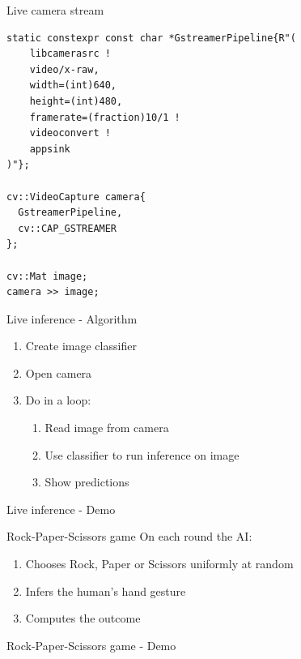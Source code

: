 \begin{frame}[fragile]{Live camera stream}
  \lstset{basicstyle=\ttfamily\small, showstringspaces=false, numbers=left,
  columns=fullflexible}
  \begin{lstlisting}
static constexpr const char *GstreamerPipeline{R"(
    libcamerasrc !
    video/x-raw,
    width=(int)640,
    height=(int)480,
    framerate=(fraction)10/1 !
    videoconvert !
    appsink
)"};

cv::VideoCapture camera{
  GstreamerPipeline,
  cv::CAP_GSTREAMER
};

cv::Mat image;
camera >> image;
  \end{lstlisting}
\end{frame}

\begin{frame}{Live inference - Algorithm}
  \begin{enumerate}
	\item Create image classifier
	\item Open camera
	\item Do in a loop:
	\begin{enumerate}
	  \item Read image from camera
	  \item Use classifier to run inference on image
	  \item Show predictions
	\end{enumerate}
  \end{enumerate}
\end{frame}

\begin{frame}{Live inference - Demo}
\end{frame}

\begin{frame}{Rock-Paper-Scissors game}
On each round the AI:
  \begin{enumerate}
	\item Chooses Rock, Paper or Scissors uniformly at random
	\item Infers the human's hand gesture
	\item Computes the outcome
  \end{enumerate}
\end{frame}

\begin{frame}{Rock-Paper-Scissors game - Demo}
\end{frame}

